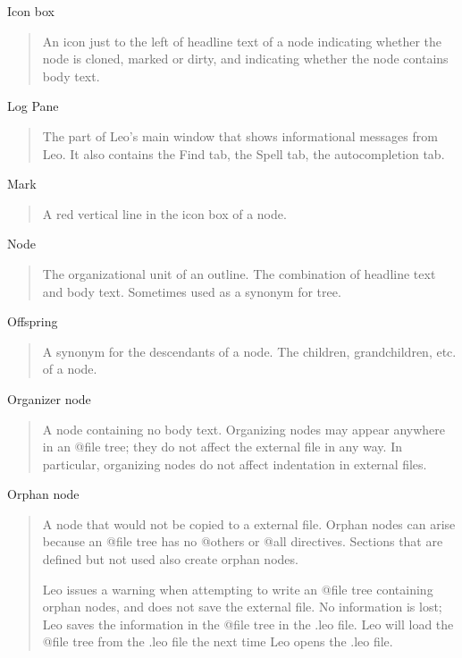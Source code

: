\documentclass[a4paper,10pt,english]{sphinxmanual}
\begin{document}
Icon box
\begin{quote}

An icon just to the left of headline text of a node indicating whether the
node is cloned, marked or dirty, and indicating whether the node contains
body text.
\end{quote}

Log Pane
\begin{quote}

The part of Leo's main window that shows informational messages from Leo. It
also contains the Find tab, the Spell tab, the autocompletion tab.
\end{quote}

Mark
\begin{quote}

A red vertical line in the icon box of a node.
\end{quote}

Node
\begin{quote}

The organizational unit of an outline. The combination of headline text and
body text. Sometimes used as a synonym for tree.
\end{quote}

Offspring
\begin{quote}

A synonym for the descendants of a node.
The children, grandchildren, etc. of a node.
\end{quote}

Organizer node
\begin{quote}

A node containing no body text. Organizing nodes may appear anywhere in an
@file tree; they do not affect the external file in any way. In particular,
organizing nodes do not affect indentation in external files.
\end{quote}

Orphan node
\begin{quote}

A node that would not be copied to a external file. Orphan nodes can arise
because an @file tree has no @others or @all directives. Sections that are
defined but not used also create orphan nodes.

Leo issues a warning when attempting to write an @file tree containing
orphan nodes, and does not save the external file. No information is lost;
Leo saves the information in the @file tree in the .leo file. Leo will load
the @file tree from the .leo file the next time Leo opens the .leo file.
\end{quote}
\end{document}
